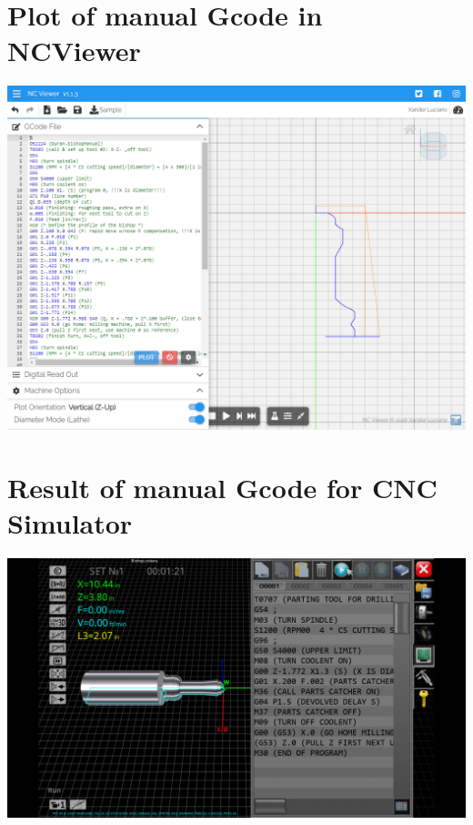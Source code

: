 \documentclass{report}
\begin{document}
\chapter{Plot of manual Gcode in NCViewer}
\begin{landscape}
\includegraphics[height=\textheight]{img/prj05-manual-gcode-ncviewer-plot-xz.png}
\end{landscape}

\addtocounter{chapter}{1}


\chapter{Result of manual Gcode for CNC Simulator}
\begin{landscape}
\null\vfill
\includegraphics[width=\linewidth]{img/prj05-cnc_simulator_result.png}
\vfill
\end{landscape}
\end{document}
